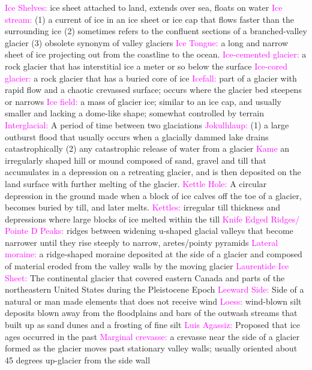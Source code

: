 \documentclass{article}
\newcommand{\pink}[1]{\textcolor{magenta}{#1}}
\newcommand{\vocab}[1]{{\pink{#1}}}
\begin{document}
\begin{multicols*}{4}
		\vocab{ Ice Shelves: }ice sheet attached to land, extends over sea, floats on water 
		\vocab{        Ice stream: } (1) a current of ice in an ice sheet or ice cap that flows faster than the surrounding ice (2) sometimes refers to the confluent sections of a branched-valley glacier (3) obsolete synonym of valley glaciers 
		\vocab{Ice Tongue: } a long and narrow sheet of ice projecting out from the coastline to the ocean.  
		\vocab{        Ice-cemented glacier: } a rock glacier that has interstitial ice a meter or so below the surface 
		\vocab{        Ice-cored glacier: } a rock glacier that has a buried core of ice
		\vocab{        Icefall: } part of a glacier with rapid flow and a chaotic crevassed surface; occurs where the glacier bed steepens or narrows 
		\vocab{        Ice field: } a mass of glacier ice; similar to an ice cap, and usually smaller and lacking a dome-like shape; somewhat controlled by terrain 
		\vocab{Interglacial: } A period of time between two glaciations  
		\vocab{        Jokulhlaup: } (1) a large outburst flood that usually occurs when a glacially dammed lake drains catastrophically (2) any catastrophic release of water from a glacier 
		\vocab{Kame} an irregularly shaped hill or mound composed of sand, gravel and till that accumulates in a depression on a retreating glacier, and is then deposited on the land surface with further melting of the glacier.  
		\vocab{Kettle Hole: } A circular depression in the ground made when a block of ice calves off the toe of a glacier, becomes buried by till, and later melts.  
		\vocab{Kettles: } irregular till thickness and depressions where large blocks of ice melted within the till  
		\vocab{Knife Edged Ridges/ Pointe D Peaks: } ridges between widening u-shaped glacial valleys that become narrower until they rise steeply to narrow, aretes/pointy pyramids 
		\vocab{        Lateral moraine: } a ridge-shaped moraine deposited at the side of a glacier and composed of material eroded from the valley walls by the moving glacier 
		\vocab{Laurentide Ice Sheet: }The continental glacier that covered eastern Canada and parts of the northeastern United States during the Pleistocene Epoch  
		\vocab{Leeward Side: }Side of a natural or man made elements that does not receive wind  
		\vocab{Loess: } wind-blown silt deposits blown away from the floodplains and bars of the outwash streams that built up as sand dunes and a frosting of fine silt  
		\vocab{Luis Agassiz: } Proposed that ice ages occurred in the past   
		\vocab{        Marginal crevasse: } a crevasse near the side of a glacier formed as the glacier moves past stationary valley walls; usually oriented about 45 degrees up-glacier from the side wall 

\end{multicols*}
\end{document}
